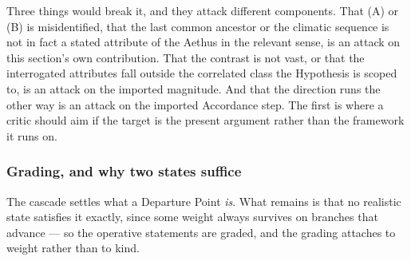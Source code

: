 \begin{example}
\begin{remark}
Three things would break it, and they attack different components.
That (A) or (B) is misidentified, that the last common ancestor or
the climatic sequence is not in fact a stated attribute of the Aethus in
the relevant sense, is an attack on this section's own contribution.
That the contrast is not vast, or that the interrogated attributes fall
outside the correlated class the Hypothesis is scoped to, is an attack
on the imported magnitude. And that the direction runs the other way is
an attack on the imported Accordance step. The first is where a critic
should aim if the target is the present argument rather than the
framework it runs on.
\end{remark}
\end{example}

\subsubsection{Grading, and why two states suffice}
\label{gc:subsub:grading}

The cascade settles what a Departure Point \emph{is}. What remains is
that no realistic state satisfies it exactly, since some weight always
survives on branches that advance --- so the operative statements are
graded, and the grading attaches to weight rather than to kind.

